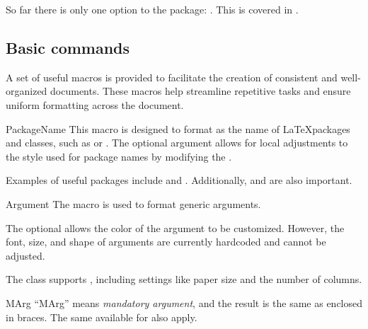 \documentclass[11pt, outdir = ./out]{article}
\begin{document}
\begin{latexcode}
    \usepackage{docs}
\end{latexcode}

So far there is only one option to the package: . This is covered in .

\subsection{Basic commands}

A set of useful macros is provided to facilitate the creation of consistent and well-organized documents. These macros help streamline repetitive tasks and ensure uniform formatting across the document.

\begin{Macrodef}{PackageName}{}{}
    This macro is designed to format  as the name of \LaTeX packages and classes, such as  or . The optional argument  allows for local adjustments to the style used for package names by modifying the .
\end{Macrodef}

\begin{DocsExample}
    Examples of useful packages include  and . Additionally,  and  are also important.
\end{DocsExample}

\begin{Macrodef}{Argument}{}{}
    The  macro is used to format generic arguments.

    The optional  allows the color of the argument to be customized. However, the font, size, and shape of arguments are currently hardcoded and cannot be adjusted.
\end{Macrodef}

\begin{DocsExample}
    The  class supports , including settings like paper size and the number of columns.
\end{DocsExample}

\begin{Macrodef}{MArg}{}{}
    ``MArg'' means \textit{mandatory argument}, and the result is the same as  enclosed in braces. The same  available for  also apply.
\end{Macrodef}
\end{document}
